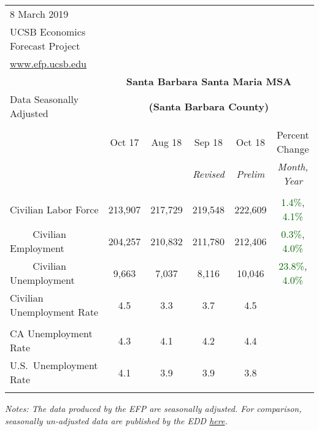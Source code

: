 \documentclass[12pt]{article}
\begin{document}
\begin{table}
\begin{tabular}{|l|c|c|c|c|c|}
\multicolumn{1}{l}{\small 8 March 2019} & \multicolumn{5}{c}{} \\
\multicolumn{1}{l}{\small UCSB Economics Forecast Project} & \multicolumn{5}{c}{} \\
\multicolumn{1}{l}{\small \href{http://www.efp.ucsb.edu/}{www.efp.ucsb.edu}} & \multicolumn{5}{c}{} \\
\multicolumn{1}{c}{} & \multicolumn{5}{c}{\large \textbf{Santa Barbara Santa Maria MSA}} \\
\multicolumn{1}{l}{\small Data Seasonally Adjusted} & \multicolumn{5}{c}{\small \textbf{(Santa Barbara County)}} \\ \hline \hline
& & & & & \\
 & Oct 17 & Aug 18 & Sep 18 & Oct 18 & Percent Change \\
 & & & \small \textit{Revised} & \small \textit{Prelim} & \small \textit{Month, Year} \\ \hline
& & & & & \\
Civilian Labor Force & 213,907 & 217,729 & 219,548 & 222,609 & \textcolor{darkgreen}{1.4\%}, \textcolor{darkgreen}{4.1\%} \\
$\qquad$ \small Civilian Employment & 204,257 & 210,832 & 211,780 & 212,406 & \textcolor{darkgreen}{0.3\%}, \textcolor{darkgreen}{4.0\%} \\
$\qquad$ \small Civilian Unemployment & 9,663 & 7,037 & 8,116 & 10,046 & \textcolor{darkgreen}{23.8\%}, \textcolor{darkgreen}{4.0\%} \\
Civilian Unemployment Rate & 4.5 & 3.3 & 3.7 & 4.5 & \\
& & & & & \\
CA Unemployment Rate & 4.3 & 4.1 & 4.2 & 4.4 & \\
U.S.\ Unemployment Rate & 4.1 & 3.9 & 3.9 & 3.8 & \\
& & & & & \\ \hline \hline
\end{tabular}
\par
\vspace{.5em}
\footnotesize
\textit{Notes: The data produced by the EFP are seasonally adjusted. For comparison, seasonally un-adjusted data are published by the EDD \href{http://www.labormarketinfo.ca.gov/file/lfmonth/satb$pds.pdf}{here}.}
\end{table}
\end{document}
